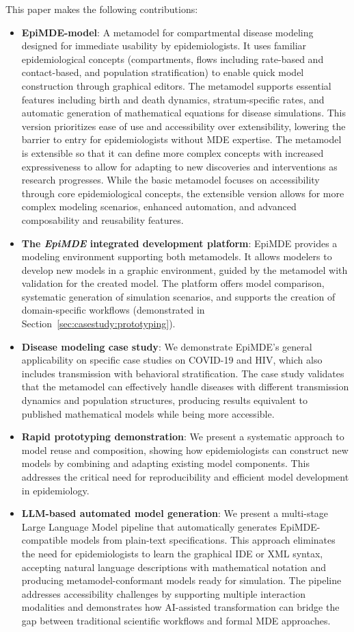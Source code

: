 This paper makes the following contributions:
\begin{itemize}
    \item \textbf{EpiMDE-model}: A metamodel for compartmental disease modeling designed for immediate usability by epidemiologists. It uses familiar epidemiological concepts (compartments, flows including rate-based and contact-based, and population stratification) to enable quick model construction through graphical editors. The metamodel supports essential features including birth and death dynamics, stratum-specific rates, and automatic generation of mathematical equations for disease simulations. This version prioritizes ease of use and accessibility over extensibility, lowering the barrier to entry for epidemiologists without MDE expertise. The metamodel is extensible so that it can define more complex concepts with increased expressiveness to allow for adapting to new discoveries and interventions as research progresses. While the basic metamodel focuses on accessibility through core epidemiological concepts, the extensible version allows for more complex modeling scenarios, enhanced automation, and advanced composability and reusability features.
    \item \textbf{The \emph{EpiMDE} integrated development platform}: EpiMDE provides a modeling environment supporting both metamodels. It allows modelers to develop new models in a graphic environment, guided by the metamodel with validation for the created model. The platform offers model comparison, systematic generation of simulation scenarios, and supports the creation of domain-specific workflows (demonstrated in Section~\ref{sec:casestudy:prototyping}).
    \item \textbf{Disease modeling case study}: We demonstrate EpiMDE's general applicability on specific case studies on COVID-19 and HIV, which also includes transmission with behavioral stratification. The case study validates that the metamodel can effectively handle diseases with different transmission dynamics and population structures, producing results equivalent to published mathematical models while being more accessible.
    \item \textbf{Rapid prototyping demonstration}: We present a systematic approach to model reuse and composition, showing how epidemiologists can construct new models by combining and adapting existing model components. This addresses the critical need for reproducibility and efficient model development in epidemiology.
    
    \item \textbf{LLM-based automated model generation}: We present a multi-stage Large Language Model pipeline that automatically generates EpiMDE-compatible models from plain-text specifications. This approach eliminates the need for epidemiologists to learn the graphical IDE or XML syntax, accepting natural language descriptions with mathematical notation and producing metamodel-conformant models ready for simulation. The pipeline addresses accessibility challenges by supporting multiple interaction modalities and demonstrates how AI-assisted transformation can bridge the gap between traditional scientific workflows and formal MDE approaches.
\end{itemize}
